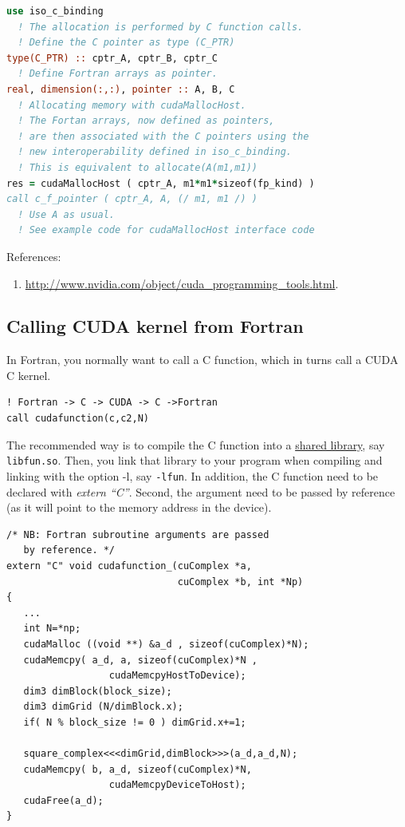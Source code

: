 \begin{lstlisting}[language=Fortran]
use iso_c_binding
  ! The allocation is performed by C function calls. 
  ! Define the C pointer as type (C_PTR)
type(C_PTR) :: cptr_A, cptr_B, cptr_C
  ! Define Fortran arrays as pointer.
real, dimension(:,:), pointer :: A, B, C
  ! Allocating memory with cudaMallocHost.
  ! The Fortan arrays, now defined as pointers, 
  ! are then associated with the C pointers using the
  ! new interoperability defined in iso_c_binding. 
  ! This is equivalent to allocate(A(m1,m1))
res = cudaMallocHost ( cptr_A, m1*m1*sizeof(fp_kind) )
call c_f_pointer ( cptr_A, A, (/ m1, m1 /) )
  ! Use A as usual.
  ! See example code for cudaMallocHost interface code

\end{lstlisting}

References:
\begin{enumerate}
\item \url{http://www.nvidia.com/object/cuda_programming_tools.html}.
\end{enumerate}

\subsection{Calling CUDA kernel from Fortran}
\label{sec:calling-cuda-kernel}

In Fortran, you normally want to call a C function, which in turns
call a CUDA C kernel.
\begin{verbatim}
! Fortran -> C -> CUDA -> C ->Fortran
call cudafunction(c,c2,N)
\end{verbatim}
The recommended way is to compile the C function into a
\hyperref[sec:shared-library-1]{shared library}, say \verb!libfun.so!.
Then, you link that library to your program when compiling and linking
with the option -l, say \verb!-lfun!.  In addition, the C function
need to be declared with {\it extern ``C''}. Second, the argument need
to be passed by reference (as it will point to the memory address in
the device).
\begin{lstlisting}
/* NB: Fortran subroutine arguments are passed 
   by reference. */
extern "C" void cudafunction_(cuComplex *a, 
                              cuComplex *b, int *Np)
{
   ...
   int N=*np;
   cudaMalloc ((void **) &a_d , sizeof(cuComplex)*N);
   cudaMemcpy( a_d, a, sizeof(cuComplex)*N , 
                  cudaMemcpyHostToDevice);
   dim3 dimBlock(block_size); 
   dim3 dimGrid (N/dimBlock.x); 
   if( N % block_size != 0 ) dimGrid.x+=1;
   
   square_complex<<<dimGrid,dimBlock>>>(a_d,a_d,N);
   cudaMemcpy( b, a_d, sizeof(cuComplex)*N,
                  cudaMemcpyDeviceToHost);
   cudaFree(a_d);
}
\end{lstlisting}

